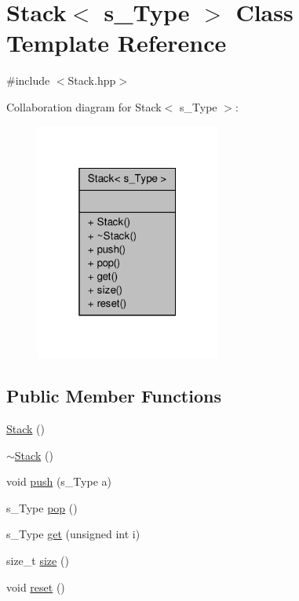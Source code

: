 \hypertarget{class_stack}{\section{Stack$<$ s\-\_\-\-Type $>$ Class Template Reference}
\label{class_stack}
}


{\ttfamily \#include $<$Stack.\-hpp$>$}



Collaboration diagram for Stack$<$ s\-\_\-\-Type $>$\-:
\nopagebreak
\begin{figure}[H]
\begin{center}
\leavevmode
\includegraphics[width=172pt]{class_stack__coll__graph}
\end{center}
\end{figure}
\subsection*{Public Member Functions}
\begin{DoxyCompactItemize}
\item 
\hyperlink{class_stack_abf4f763ab93fcb1fd22cd381f521a7e2}{Stack} ()
\item 
\hyperlink{class_stack_ac2ccdf42c9ae247ec99db786cdb7222f}{$\sim$\-Stack} ()
\item 
void \hyperlink{class_stack_a458c3a1083e133a2bca0e5cb4aa8bcb9}{push} (s\-\_\-\-Type a)
\item 
s\-\_\-\-Type \hyperlink{class_stack_a78bb9fa57bd39e0e76bc5231870afa04}{pop} ()
\item 
s\-\_\-\-Type \hyperlink{class_stack_af2960e123bfbf1928b1d8058378dc81a}{get} (unsigned int i)
\item 
size\-\_\-t \hyperlink{class_stack_a41b54c9ef621409d6125b99fc566a659}{size} ()
\item 
void \hyperlink{class_stack_aeecf55b18f487aa18e278a5d9f3c3e7f}{reset} ()
\end{DoxyCompactItemize}


